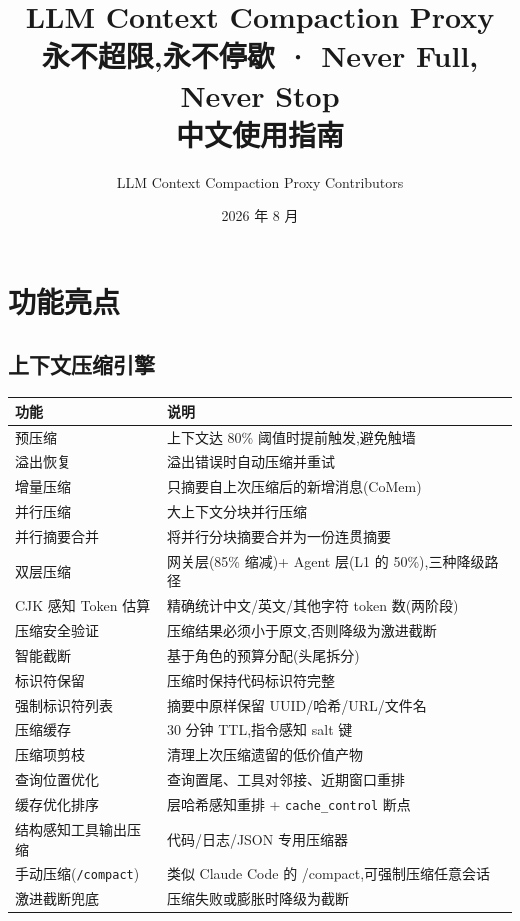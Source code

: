 \documentclass[11pt,a4paper]{article}
\title{\textbf{LLM Context Compaction Proxy}\\[0.3em]
\large 永不超限,永不停歇 · Never Full, Never Stop\\[0.3em]
\large 中文使用指南}
\author{LLM Context Compaction Proxy Contributors}
\date{2026 年 8 月}
\begin{document}
\maketitle
\tableofcontents
\newpage

\section{功能亮点}

\subsection{上下文压缩引擎}

\begin{longtable}{@{}lp{10cm}@{}}
  \toprule
  功能 & 说明 \\
  \midrule
  预压缩 & 上下文达 80\% 阈值时提前触发,避免触墙 \\
  溢出恢复 & 溢出错误时自动压缩并重试 \\
  增量压缩 & 只摘要自上次压缩后的新增消息(CoMem) \\
  并行压缩 & 大上下文分块并行压缩 \\
  并行摘要合并 & 将并行分块摘要合并为一份连贯摘要 \\
  双层压缩 & 网关层(85\% 缩减)+ Agent 层(L1 的 50\%),三种降级路径 \\
  CJK 感知 Token 估算 & 精确统计中文/英文/其他字符 token 数(两阶段) \\
  压缩安全验证 & 压缩结果必须小于原文,否则降级为激进截断 \\
  智能截断 & 基于角色的预算分配(头尾拆分) \\
  标识符保留 & 压缩时保持代码标识符完整 \\
  强制标识符列表 & 摘要中原样保留 UUID/哈希/URL/文件名 \\
  压缩缓存 & 30 分钟 TTL,指令感知 salt 键 \\
  压缩项剪枝 & 清理上次压缩遗留的低价值产物 \\
  查询位置优化 & 查询置尾、工具对邻接、近期窗口重排 \\
  缓存优化排序 & 层哈希感知重排 + \texttt{cache\_control} 断点 \\
  结构感知工具输出压缩 & 代码/日志/JSON 专用压缩器 \\
  手动压缩(\texttt{/compact}) & 类似 Claude Code 的 /compact,可强制压缩任意会话 \\
  激进截断兜底 & 压缩失败或膨胀时降级为截断 \\
  \bottomrule
\end{longtable}
\end{document}
